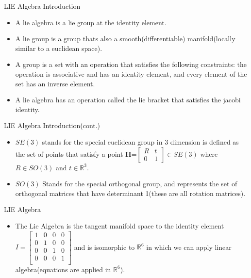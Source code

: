 \documentclass{beamer}
\begin{document}
\begin{frame}{LIE Algebra Introduction}
\begin{itemize}
\item A lie algebra is a lie group at the identity element.
\item A lie group is a group thats also a smooth(differentiable) manifold(locally similar to a euclidean space).
\item A group is a set with an operation that satisfies the following constraints: the operation is associative and has an identity element, and every element of the set has an inverse element.
\item A lie algebra has an operation called the lie bracket that satisfies the jacobi identity. 
\end{itemize}
\end{frame}


\begin{frame}{LIE Algebra Introduction(cont.)}
\begin{itemize}
    \item $SE(3)$ stands for the special euclidean group in 3 dimension is defined as the set of points that satisfy a point \textbf{H}=$\begin{bmatrix}
        R & t\\
        0 & 1
    \end{bmatrix} \in SE(3)$ where $R \in SO(3)$ and $t \in \mathbb{R}^3$.
    \item $SO(3)$ Stands for the special orthogonal group, and represents the set of orthogonal matrices that have determinant 1(these are all rotation matrices). 
\end{itemize}
\end{frame}


\begin{frame}{LIE Algebra}
\begin{itemize}
    \item The Lie Algebra is the tangent manifold space to the identity element $I= \begin{bmatrix}
        1 & 0 & 0 & 0\\
        0 & 1 & 0 & 0\\
        0 & 0 & 1 & 0\\
        0 & 0 & 0 & 1\\
    \end{bmatrix}$ and is isomorphic to $\mathbb{R}^6$ in which we can apply linear algebra(equations are applied in $\mathbb{R}^6$).
\end{itemize}
\end{frame}
\end{document}
